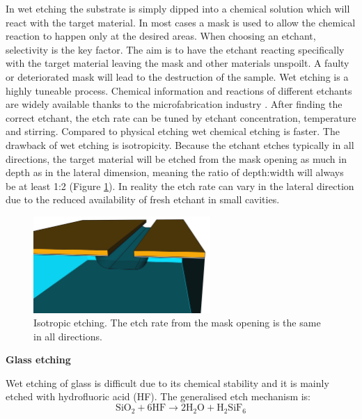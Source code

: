 \documentclass[final]{jyflluk}
\begin{document}
In wet etching the substrate is simply dipped into a chemical solution which will react with the target material. In most cases a mask is used to allow the chemical reaction to happen only at the desired areas. When choosing an etchant, selectivity is the key factor. The aim is to have the etchant reacting specifically with the target material leaving the mask and other materials unspoilt. A faulty or deteriorated mask will lead to the destruction of the sample. 
Wet etching is a highly tuneable process. Chemical information and reactions of different etchants are widely available thanks to the microfabrication industry \cite{williams2003etch}. After finding the correct etchant, the etch rate can be tuned by etchant concentration, temperature and stirring. Compared to physical etching wet chemical etching is faster. The drawback of wet etching is isotropicity. Because the etchant etches typically in all directions, the target material will be etched from the mask opening as much in depth as in the lateral dimension, meaning the ratio of depth:width will always be at least 1:2 (Figure \ref{fig:isotropy}). In reality the etch rate can vary in the lateral direction due to the reduced availability of fresh etchant in small cavities. \cite{lee2010microfabrication}
\begin{figure}[h]
    \centering
    \hspace*{1cm}\includegraphics[width=0.6\textwidth]{images/isotrpy.png}\hspace*{-1cm}
    \caption{Isotropic etching. The etch rate from the mask opening is the same in all directions.}
    \label{fig:isotropy}
\end{figure}
\newline
\newline
\textbf{Glass etching}

Wet etching of glass is difficult due to its chemical stability and it is mainly etched with hydrofluoric acid (HF). The generalised etch mechanism is: \cite{etch_formula}
\begin{equation}
    \label{eq:HF_etch}
    \mathrm{SiO_2} + \mathrm{6HF} \rightarrow  \mathrm{2H_2 O} + \mathrm{H_2 Si F_6}
\end{equation}
\end{document}
